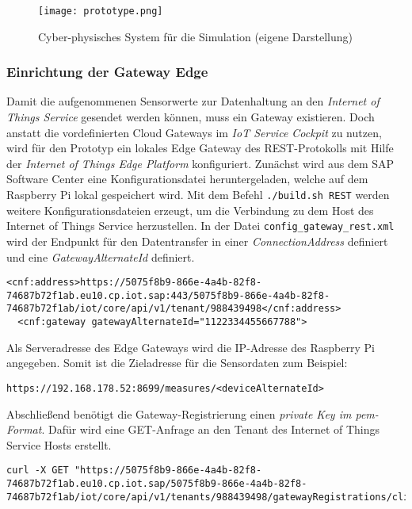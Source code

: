 \begin{figure}[H]
  \centering
  \texttt{[image: prototype.png]}
  \caption[Cyberphysisches System für die Simulation]{Cyber-physisches System für die Simulation (eigene Darstellung)}
  \label{raspi}
\end{figure}


\subsubsection{Einrichtung der Gateway Edge}

Damit die aufgenommenen Sensorwerte zur Datenhaltung an den \textit{Internet of Things Service} gesendet werden können, muss ein Gateway existieren. Doch anstatt die vordefinierten Cloud Gateways im \textit{IoT Service Cockpit} zu nutzen, wird für den Prototyp ein lokales Edge Gateway des REST-Protokolls mit Hilfe der \textit{Internet of Things Edge Platform} konfiguriert. Zunächst wird aus dem SAP Software Center eine Konfigurationsdatei heruntergeladen, welche auf dem Raspberry Pi lokal gespeichert wird. Mit dem Befehl \texttt{./build.sh REST} werden weitere Konfigurationsdateien erzeugt, um die Verbindung zu dem Host des Internet of Things Service herzustellen. In der Datei \texttt{config\_gateway\_rest.xml} wird der Endpunkt für den Datentransfer in einer \textit{ConnectionAddress} definiert und eine \textit{GatewayAlternateId} definiert.

\begin{lstlisting}[caption= Gateway-Verbindung zur Cloud]
  <cnf:address>https://5075f8b9-866e-4a4b-82f8-74687b72f1ab.eu10.cp.iot.sap:443/5075f8b9-866e-4a4b-82f8-74687b72f1ab/iot/core/api/v1/tenant/988439498</cnf:address>
  <cnf:gateway gatewayAlternateId="1122334455667788">
\end{lstlisting}
Als Serveradresse des Edge Gateways wird die IP-Adresse des Raspberry Pi angegeben. Somit ist die Zieladresse für die Sensordaten zum Beispiel:

\begin{lstlisting}[caption= Zieladresse für Sensorwerte]
  https://192.168.178.52:8699/measures/<deviceAlternateId>\end{lstlisting}

\noindent Abschließend benötigt die Gateway-Registrierung einen \textit{private Key im pem-Format}. Dafür wird eine GET-Anfrage an den Tenant des Internet of Things Service Hosts erstellt.

\begin{lstlisting}[caption= GET-Anfrage für einen Client-Key]
curl -X GET "https://5075f8b9-866e-4a4b-82f8-74687b72f1ab.eu10.cp.iot.sap/5075f8b9-866e-4a4b-82f8-74687b72f1ab/iot/core/api/v1/tenants/988439498/gatewayRegistrations/clientCertificate/pem\end{lstlisting}

